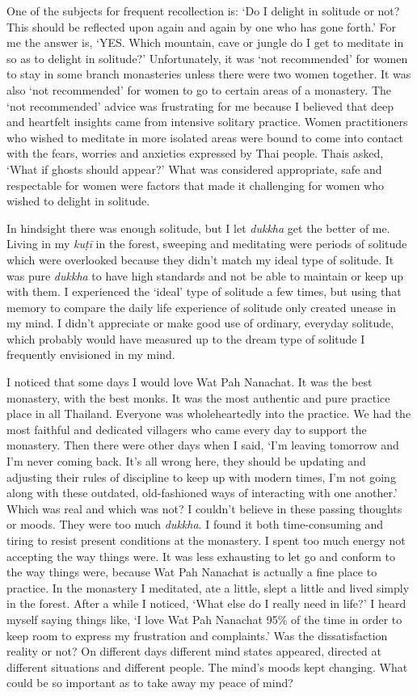 One of the subjects for frequent recollection is: `Do I delight in
solitude or not? This should be reflected upon again and again by one
who has gone forth.' For me the answer is, `YES. Which mountain, cave or
jungle do I get to meditate in so as to delight in solitude?'
Unfortunately, it was `not recommended' for women to stay in some branch
monasteries unless there were two women together. It was also `not
recommended' for women to go to certain areas of a monastery. The `not
recommended' advice was frustrating for me because I believed that deep
and heartfelt insights came from intensive solitary practice. Women
practitioners who wished to meditate in more isolated areas were bound
to come into contact with the fears, worries and anxieties expressed by
Thai people. Thais asked, `What if ghosts should appear?' What was
considered appropriate, safe and respectable for women were factors that
made it challenging for women who wished to delight in solitude.

In
hindsight there was enough solitude, but I let \emph{dukkha} get the
better of me. Living in my \emph{kuṭī} in the forest, sweeping and
meditating were periods of solitude which were overlooked because they
didn't match my ideal type of solitude. It was pure \emph{dukkha} to
have high standards and not be able to maintain or keep up with them. I
experienced the `ideal' type of solitude a few times, but using that
memory to compare the daily life experience of solitude only created
unease in my mind. I didn't appreciate or make good use of ordinary, 
everyday solitude, which probably would have measured up to the dream
type of solitude I frequently envisioned in my mind. 

I noticed that some days I would love Wat Pah Nanachat. It was the best
monastery, with the best monks. It was the most authentic and pure
practice place in all Thailand. Everyone was wholeheartedly into the
practice. We had the most faithful and dedicated villagers who came
every day to support the monastery. Then there were other days when I
said, `I'm leaving tomorrow and I'm never coming back. It's all wrong
here, they should be updating and adjusting their rules of discipline to
keep up with modern times, I'm not going along with these outdated, 
old-fashioned ways of interacting with one another.' Which was real and
which was not? I couldn't believe in these passing thoughts or moods. 
They were too much \emph{dukkha}. I found it both time-consuming and
tiring to resist present conditions at the monastery. I spent too much
energy not accepting the way things were. It was less exhausting to let
go and conform to the way things were, because Wat Pah Nanachat is
actually a fine place to practice. In the monastery I meditated, ate a
little, slept a little and lived simply in the forest. After a while I
noticed, `What else do I really need in life?' I heard myself saying
things like, `I love Wat Pah Nanachat 95\% of the time in order to keep
room to express my frustration and complaints.' Was the dissatisfaction
reality or not? On different days different mind states appeared, 
directed at different situations and different people. The mind's moods
kept changing. What could be so important as to take away my peace of
mind? 

